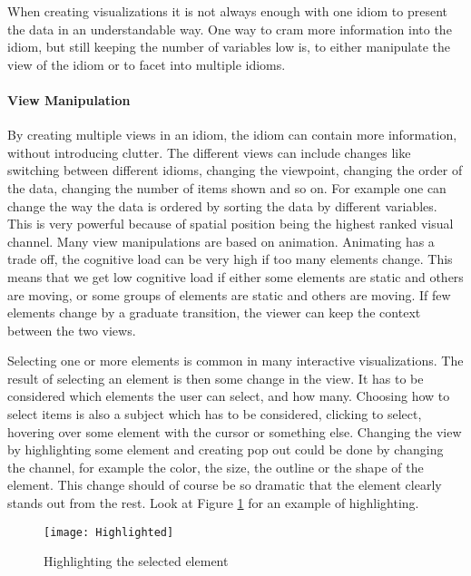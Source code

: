 \documentclass[Report.tex]{subfiles}
\begin{document}
When creating visualizations it is not always enough with one idiom to present the data in an understandable way. One way to cram more information into the idiom, but still keeping the number of variables low is, to either manipulate the view of the idiom or to facet into multiple idioms. 
\paragraph{View Manipulation\\}
By creating multiple views in an idiom, the idiom can contain more information, without introducing clutter. The different views can include changes like switching between different idioms, changing the viewpoint, changing the order of the data, changing the number of items shown and so on. For example one can change the way the data is ordered by sorting the data by different variables. This is very powerful because of spatial position being the highest ranked visual channel. Many view manipulations are based on animation. Animating has a trade off, the cognitive load can be very high if too many elements change. This means that we get low cognitive load if either some elements are static and others are moving, or some groups of elements are static and others are moving. If few elements change by a graduate transition, the viewer can keep the context between the two views. \cite[Chapter 11]{Tamara}

Selecting one or more elements is common in many interactive visualizations. The result of selecting an element is then some change in the view. It has to be considered which elements the user can select, and how many. Choosing how to select items is also a subject which has to be considered, clicking to select, hovering over some element with the cursor or something else. 
Changing the view by highlighting some element and creating pop out could be done by changing the channel, for example the color, the size, the outline or the shape of the element. This change should of course be so dramatic that the element clearly stands out from the rest. Look at Figure \ref{fig:highlighted} for an example of highlighting. \cite[Chapter 11]{Tamara}
\begin{figure}
\center
\texttt{[image: Highlighted]}
\caption{Highlighting the selected element}
\label{fig:highlighted}
\end{figure}
\end{document}
